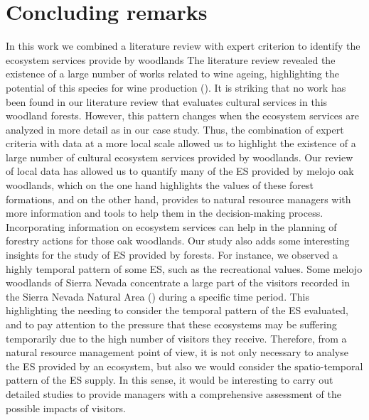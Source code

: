 \section{Concluding remarks}\label{sec:es:concluding} 
In this work we combined a literature review with expert criterion to identify the ecosystem services provide by \Qp woodlands The literature review revealed the existence of a large number of works related to wine ageing, highlighting the potential of this species for wine production (). It is striking that no work has been found in our literature review that evaluates cultural services in this woodland forests. However, this pattern changes when the ecosystem services are analyzed in more detail as in our case study. Thus, the combination of expert criteria with data at a more local scale allowed us to highlight the existence of a large number of cultural ecosystem services provided by \Qp woodlands. 
Our review of local data has allowed us to quantify many of the ES provided by melojo oak woodlands, which on the one hand highlights the values of these forest formations, and on the other hand, provides to natural resource managers with more information and tools to help them in the decision-making process. Incorporating information on ecosystem services can help in the planning of forestry actions for those oak woodlands. Our study also adds some interesting insights for the study of ES provided by forests. For instance, we observed a highly temporal pattern of some ES, such as the recreational values. Some melojo woodlands of Sierra Nevada concentrate a large part of the visitors recorded in the Sierra Nevada Natural Area () during a specific time period. This highlighting the needing to consider the temporal pattern of the ES evaluated, and to pay attention to the pressure that these ecosystems may be suffering temporarily due to the high number of visitors they receive. Therefore, from a natural resource management point of view,  it is not only necessary to analyse the ES provided by an ecosystem, but also we would consider the spatio-temporal pattern of the ES supply. In this sense, it would be interesting to carry out detailed studies to provide managers with a comprehensive assessment of the possible impacts of visitors.

